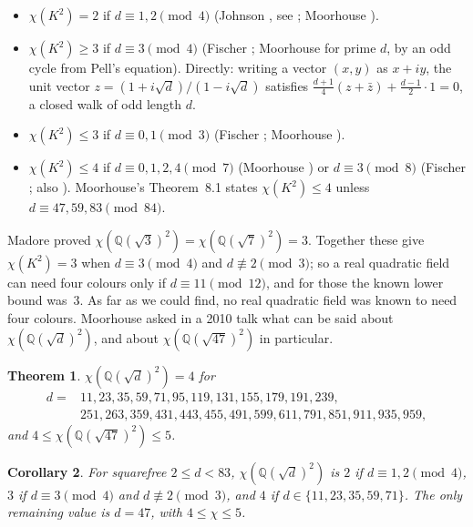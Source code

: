 \documentclass[11pt,a4paper]{amsart}
\newtheorem{theorem}{Theorem}
\newtheorem{corollary}[theorem]{Corollary}
\theoremstyle{remark}
\newcommand{\Q}{\mathbb{Q}}
\begin{document}
\begin{itemize}
\item $\chi(K^2)=2$ if $d\equiv1,2\pmod 4$ (Johnson \cite{Johnson1987}, see \cite{Payne}; Moorhouse
  \cite[Lemma~8.4, Theorem~8.5]{Moorhouse}).
\item $\chi(K^2)\ge3$ if $d\equiv3\pmod 4$ (Fischer \cite[Theorem~8]{Fischer1990}; Moorhouse
  \cite[Theorem~8.6]{Moorhouse} for prime $d$, by an odd cycle from Pell's equation). Directly: writing a
  vector $(x,y)$ as $x+iy$, the unit vector $z=(1+i\sqrt d)/(1-i\sqrt d)$ satisfies
  $\frac{d+1}4(z+\bar z)+\frac{d-1}2\cdot1=0$, a closed walk of odd length $d$.
\item $\chi(K^2)\le3$ if $d\equiv0,1\pmod3$ (Fischer \cite[Theorem~9]{Fischer1990}; Moorhouse
  \cite[Corollary~8.3]{Moorhouse}).
\item $\chi(K^2)\le4$ if $d\equiv0,1,2,4\pmod7$ (Moorhouse \cite[Corollary~8.3]{Moorhouse}) or
  $d\equiv3\pmod8$ (Fischer \cite[Theorem~10]{Fischer1990}; also \cite[\texttt{RESULTS.md}, \S0, item~3]{MM}). Moorhouse's
  Theorem~8.1 states $\chi(K^2)\le4$ unless $d\equiv47,59,83\pmod{84}$.
\end{itemize}

Madore \cite{Madore} proved $\chi(\Q(\sqrt3)^2)=\chi(\Q(\sqrt7)^2)=3$. Together these give $\chi(K^2)=3$ when
$d\equiv3\pmod4$ and $d\not\equiv2\pmod3$; so a real quadratic field can need four colours only if
$d\equiv11\pmod{12}$, and for those the known lower bound was~$3$. As far as we could find, no real quadratic
field was known to need four colours. Moorhouse asked in a 2010 talk \cite{MoorhouseTalk} what can be said
about $\chi(\Q(\sqrt d)^2)$, and about $\chi(\Q(\sqrt{47})^2)$ in particular.

\begin{theorem}\label{thm:main}
$\chi(\Q(\sqrt d)^2)=4$ for
\[\begin{aligned}d={}&11, 23, 35, 59, 71, 95, 119, 131, 155, 179, 191, 239,\\
&251, 263, 359, 431, 443, 455, 491, 599, 611, 791, 851, 911, 935, 959,\end{aligned}\]
and $4\le\chi(\Q(\sqrt{47})^2)\le5$.
\end{theorem}

\begin{corollary}\label{cor:small}
For squarefree $2\le d<83$, $\chi(\Q(\sqrt d)^2)$ is $2$ if $d\equiv1,2\pmod4$, $3$ if $d\equiv3\pmod4$ and
$d\not\equiv2\pmod3$, and $4$ if $d\in\{11,23,35,59,71\}$. The only remaining value is $d=47$, with
$4\le\chi\le5$.
\end{corollary}
\end{document}
